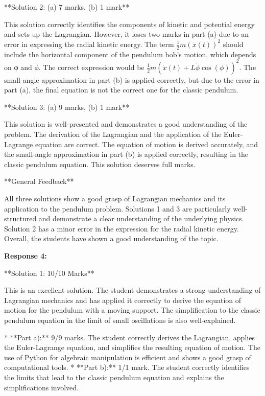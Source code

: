 \documentclass[a4paper,11pt]{article}
\begin{document}
**Solution 2: (a) 7 marks, (b) 1 mark**

This solution correctly identifies the components of kinetic and potential energy and sets up the Lagrangian. However, it loses two marks in part (a) due to an error in expressing the radial kinetic energy. The term \(\frac{1}{2} m (\dot{x}(t))^2 \) should include the horizontal component of the pendulum bob's motion, which depends on φ and \(\dot{\phi}\). The correct expression would be \(\frac{1}{2}m(\dot{x}(t) + L\dot{\phi}\cos(\phi))^2\). The small-angle approximation in part (b) is applied correctly, but due to the error in part (a), the final equation is not the correct one for the classic pendulum.

**Solution 3: (a) 9 marks, (b) 1 mark**

This solution is well-presented and demonstrates a good understanding of the problem. The derivation of the Lagrangian and the application of the Euler-Lagrange equation are correct. The equation of motion is derived accurately, and the small-angle approximation in part (b) is applied correctly, resulting in the classic pendulum equation. This solution deserves full marks.

**General Feedback**

All three solutions show a good grasp of Lagrangian mechanics and its application to the pendulum problem. Solutions 1 and 3 are particularly well-structured and demonstrate a clear understanding of the underlying physics. Solution 2 has a minor error in the expression for the radial kinetic energy. Overall, the students have shown a good understanding of the topic.

\textbf{Response 4:}

**Solution 1: 10/10 Marks**

This is an excellent solution. The student demonstrates a strong understanding of Lagrangian mechanics and has applied it correctly to derive the equation of motion for the pendulum with a moving support. The simplification to the classic pendulum equation in the limit of small oscillations is also well-explained.

*   **Part a):** 9/9 marks. The student correctly derives the Lagrangian, applies the Euler-Lagrange equation, and simplifies the resulting equation of motion. The use of Python for algebraic manipulation is efficient and shows a good grasp of computational tools.
*   **Part b):** 1/1 mark. The student correctly identifies the limits that lead to the classic pendulum equation and explains the simplifications involved.
\end{document}

